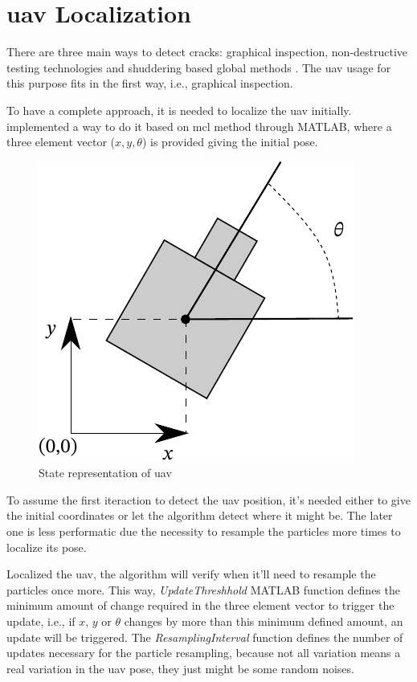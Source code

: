 \section{\gls*{uav} Localization}

There are three main ways to detect cracks: graphical inspection, non-destructive testing technologies and shuddering based global methods \citep{addagatlamodern}. The \gls*{uav} usage for this purpose fits in the first way, i.e., graphical inspection.

To have a complete approach, it is needed to localize the \gls*{uav} initially. \citet{sushant2017localization} implemented a way to do it based on \gls*{mcl} method through MATLAB, where a three element vector (\(x,y,\theta\)) is provided giving the initial pose.
%
\begin{figure}[H]
    \centering
    \includegraphics{figures/uav_localization.pdf}
    \caption{State representation of \gls*{uav}}
\end{figure}

To assume the first iteraction to detect the \gls*{uav} position, it's needed either to give the initial coordinates or let the algorithm detect where it might be.
The later one is less performatic due the necessity to resample the particles more times to localize its pose.

Localized the \gls*{uav}, the algorithm will verify when it'll need to resample the particles once more. This way, \emph{UpdateThreshhold} MATLAB function defines the minimum amount of change required in the three element vector to trigger the update, i.e., if \(x\), \(y\) or \(\theta\) changes by more than this minimum defined amount, an update will be triggered. The \emph{ResamplingInterval} function defines the number of updates necessary for the particle resampling, because not all variation means a real variation in the \gls*{uav} pose, they just might be some random noises.


